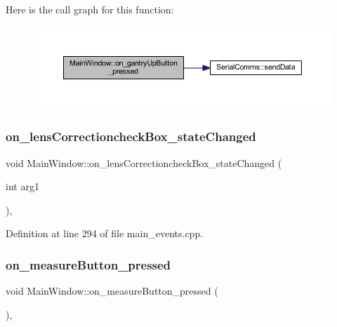 Here is the call graph for this function\+:
\nopagebreak
\begin{figure}[H]
\begin{center}
\leavevmode
\includegraphics[width=350pt]{classMainWindow_a6977641f537b731bb9ede0c341388fb1_cgraph}
\end{center}
\end{figure}
\mbox{\label{classMainWindow_a67e14c051d3926ca57a97c271dcf7013}} 
\subsubsection{\texorpdfstring{on\_lensCorrectioncheckBox\_stateChanged}{on\_lensCorrectioncheckBox\_stateChanged}}
{\footnotesize\ttfamily void Main\+Window\+::on\+\_\+lens\+Correctioncheck\+Box\+\_\+state\+Changed (\begin{DoxyParamCaption}\item[{int}]{arg1 }\end{DoxyParamCaption})\hspace{0.3cm}{\ttfamily [private]}, {\ttfamily [slot]}}



Definition at line 294 of file main\+\_\+events.\+cpp.

\mbox{\label{classMainWindow_aa9bd65042eb23d5fa3f548da285067a6}} 
\subsubsection{\texorpdfstring{on\_measureButton\_pressed}{on\_measureButton\_pressed}}
{\footnotesize\ttfamily void Main\+Window\+::on\+\_\+measure\+Button\+\_\+pressed (\begin{DoxyParamCaption}{ }\end{DoxyParamCaption})\hspace{0.3cm}{\ttfamily [private]}, {\ttfamily [slot]}}



